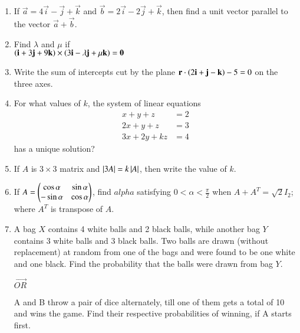 \documentclass[journal,12pt,twocolumn]{IEEEtran}
\theoremstyle{remark}
\begin{document}
\begin{enumerate}
\item If $\vec{a} = 4\vec{i} -\vec{j} + \vec{k}$ and $\vec{b} = 2\vec{i} -2\vec{j} + \vec{k} $, then find a unit vector parallel to the vector $\vec{a} + \vec{b} $.\\

\item Find $\lambda$ and $\mu$ if\\
$\left(\mathbf{i} + 3\mathbf{j} + 9\mathbf{k}\right)\times\left(3\mathbf{i} - \lambda\mathbf{j} + \mu\mathbf{k}\right) = \mathbf{0}$\\

\item Write the sum of intercepts cut by the plane $\mathbf{r}\cdot\left(2\mathbf{i} + \mathbf{j} - \mathbf{k}\right) - 5 = 0$ on the three axes.\\

\item For what values of $k$, the system of linear equations
\begin{align}
x+y+z &= 2\\
2x+y+z &= 3\\
3x+2y+kz &= 4
\end{align}
has a unique solution?\\

\item If $A$ is $3\times 3$ matrix and $\left\vert3A\right\vert = k\left\vert A\right\vert$, then write the value of $k$.\\

\item If $A = \begin{pmatrix}\cos{\alpha} & \sin{\alpha}\\ -\sin{\alpha} & \cos{\alpha}\end{pmatrix}$, find $alpha$ satisfying $0 < \alpha < \frac{\pi}{2}$ when $A + A^T = \sqrt{2}I_2$; where $A^T$ is transpose of $A$.\\ 

\item A bag $X$ contains 4 white balls and 2 black balls, while another bag $Y$ contains 3 white balls and 3 black balls. Two balls are drawn (without replacement) at random from one of the bags and were found to be one white and one black. Find the probability that the balls were drawn from bag $Y$.
\begin{center} $\vec{OR}$ \\ \end{center}
A and B throw a pair of dice alternately, till one of them gets a total of 10 and wins the game. Find their respective probabilities of winning, if A starts first.\\


\end{enumerate}
\end{document}
